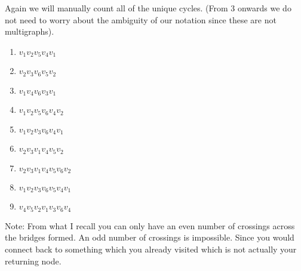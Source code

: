 \documentclass[12pt]{article}
\theoremstyle{plain}
\begin{document}
Again we will manually count all of the unique cycles. (From 3
onwards we do not need to worry about the ambiguity of our
notation since these are not multigraphs).

\begin{enumerate}
\item $v_1 v_2 v_5 v_4 v_1$
\item $v_2 v_3 v_6 v_5 v_2$
\item $v_1 v_4 v_6 v_3 v_1$
\item $v_1 v_2 v_5 v_6 v_4 v_2$
\item $v_1 v_2 v_3 v_6 v_4 v_1$
\item $v_2 v_3 v_1 v_4 v_5 v_2$
\item $v_2 v_3 v_1 v_4 v_5 v_6 v_2$
\item $v_1 v_2 v_3 v_6 v_5 v_4 v_1$
\item $v_4 v_5 v_2 v_1 v_3 v_6 v_4$
\end{enumerate}

Note: From what I recall you can only have an even number of 
crossings across the bridges formed. An odd number of crossings
is impossible. Since you would connect back to something which
you already visited which is not actually your returning
node.

\begin{figure}[H]
\centering
{}
\end{figure}
\end{document}
